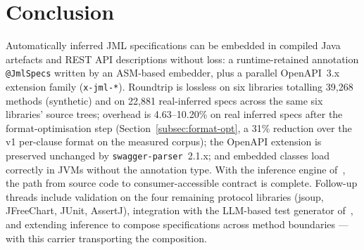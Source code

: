 \section{Conclusion}
\label{sec:conclusion}

Automatically inferred JML specifications can be embedded in compiled Java artefacts and REST API descriptions without loss: a runtime-retained annotation \texttt{@JmlSpecs} written by an ASM-based embedder, plus a parallel OpenAPI~3.x extension family (\texttt{x-jml-*}). Roundtrip is lossless on six libraries totalling 39{,}268 methods (synthetic) and on 22{,}881 real-inferred specs across the same six libraries' source trees; overhead is 4.63--10.20\% on real inferred specs after the format-optimisation step (Section~\ref{subsec:format-opt}, a 31\% reduction over the v1 per-clause format on the measured corpus); the OpenAPI extension is preserved unchanged by \texttt{swagger-parser}~2.1.x; and embedded classes load correctly in JVMs without the annotation type. With the inference engine of~\cite{edmonds2026inference}, the path from source code to consumer-accessible contract is complete. Follow-up threads include validation on the four remaining protocol libraries (jsoup, JFreeChart, JUnit, AssertJ), integration with the LLM-based test generator of~\cite{edmonds2026inference}, and extending inference to compose specifications across method boundaries --- with this carrier transporting the composition.
